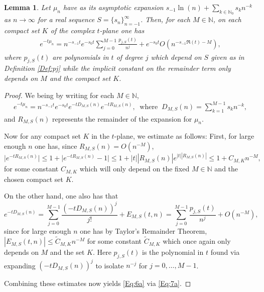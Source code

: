\documentclass[letterpaper,10pt]{amsart}
\newtheorem{lem}[thm]{Lemma}
\numberwithin{equation}{section}
\begin{document}
\begin{lem}\label{Lem:GenAsymp}
Let $\mu_n$ have as its asymptotic expansion $s_{-1}\ln(n)+\sum_{k\in\mathbb{N}_0}s_{k}n^{-k}$ as $n\to\infty$ for a real sequence $S=\{s_n\}_{n=-1}^\infty$. Then, for each $M\in\mathbb{N}$, on each compact set $K$ of the complex $t$-plane one has
\begin{align}\label{Eq:6a}
    e^{-t\mu_n} = n^{-s_{-1}t}e^{-s_0 t}\sum_{j=0}^{M-1}\frac{p_{j,S}(t)}{n^j}+e^{-s_0 t}O(n^{-s_{-1}\Re(t)-M}),
\end{align}
where $p_{j,S}(t)$ are polynomials in $t$ of degree $j$ which depend on $S$ given as in Definition \ref{Def:pj} while the implicit constant on the remainder term only depends on $M$ and the compact set $K$.
\end{lem}
\begin{proof}
We being by writing for each $M\in\mathbb{N}$,
\begin{align}\label{Eq:7a}
e^{-t\mu_n}=n^{-s_{-1}t}e^{-s_0 t}e^{-t D_{M,S}(n)}e^{-t R_{M,S}(n)},\ \text{ where }\ D_{M,S}(n)=\sum_{k=1}^{M-1} s_kn^{-k},
\end{align}
and $R_{M,S}(n)$ represents the remainder of the expansion for $\mu_n$.

Now for any compact set $K$ in the $t$-plane, we estimate as follows: First, for large enough $n$ one has, since $R_{M,S}(n)=O(n^{-M})$,
\begin{equation}
\big|e^{-t R_{M,S}(n)}\big|\leq 1+\big|e^{-t R_{M,S}(n)}-1\big|\leq 1+|t| |R_{M,S}(n)|e^{|t||R_{M,S}(n)|}\leq 1+ C_{M,K} n^{-{M}},
\end{equation}
for some constant $C_{M,K}$ which will only depend on the fixed $M\in\mathbb{N}$ and the chosen compact set $K$.

On the other hand, one also has that
\begin{equation}\label{Eq:9a}
e^{-t D_{M,S}(n)}=\sum_{j=0}^{M-1}\frac{(-t D_{M,S}(n))^j}{j!}+E_{M,S}(t,n)=\sum_{j=0}^{M-1}\frac{p_{j,S}(t)}{n^j}+O(n^{-M}),
\end{equation}
since for large enough $n$ one has by Taylor's Remainder Theorem, $|E_{M,S}(t,n)|\leq \widetilde{C}_{M,K}n^{-M}$ for some constant $\widetilde{C}_{M,K}$ which once again only depends on $M$ and the set $K$. Here $p_{j,S}(t)$ is the polynomial in $t$ found via expanding $(-t D_{M,S}(n))^j$ to isolate $n^{-j}$ for $j=0,\dots,M-1$.

Combining these estimates now yields \eqref{Eq:6a} via \eqref{Eq:7a}.


\end{proof}
\end{document}

